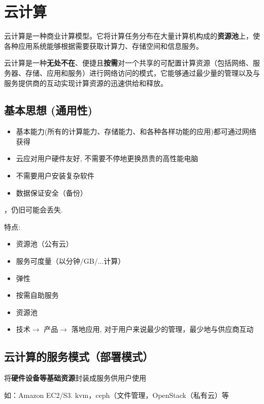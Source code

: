 \section{云计算}

\begin{definition}[云计算]
    云计算是一种商业计算模型。它将计算任务分布在大量计算机构成的\textbf{资源池}上，使各种应用系统能够根据需要获取计算力、存储空间和信息服务。

    云计算是一种\textbf{无处不在}、便捷且\textbf{按需}对一个共享的可配置计算资源（包括网络、服务器、存储、应用和服务）进行网络访问的模式，它能够通过最少量的管理以及与服务提供商的互动实现计算资源的迅速供给和释放。
\end{definition}

\subsection{基本思想 (通用性)}

\begin{itemize}
    \item 基本能力(所有的计算能力、存储能力、和各种各样功能的应用)都可通过网络获得
    \item 云应对用户硬件友好, 不需要不停地更换昂贵的高性能电脑
    \item 不需要用户安装复杂软件
    \item 数据保证安全（备份）
\end{itemize}

，仍旧可能会丢失.

特点:
\begin{itemize}
    \item 资源池（公有云）
    \item 服务可度量（以分钟/GB/...计算）
    \item 弹性
    \item 按需自助服务
    \item 资源池
    \item 技术$\rightarrow$ 产品$\rightarrow$ 落地应用, 对于用户来说最少的管理，最少地与供应商互动
\end{itemize}

\subsection{云计算的服务模式（部署模式）}

\begin{definition}
    将\textbf{硬件设备等基础资源}封装成服务供用户使用

    如：Amazon EC2/S3. kvm，ceph（文件管理，OpenStack（私有云）等
\end{definition}

